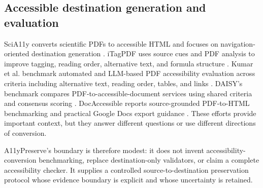 \subsection{Accessible destination generation and evaluation}
SciA11y converts scientific PDFs to accessible HTML and focuses on navigation-oriented destination generation \cite{wang2021scia11y}. iTagPDF uses source cues and PDF analysis to improve tagging, reading order, alternative text, and formula structure \cite{mowar2026}. Kumar et al. benchmark automated and LLM-based PDF accessibility evaluation across criteria including alternative text, reading order, tables, and links \cite{kumar2025}. DAISY's benchmark compares PDF-to-accessible-document services using shared criteria and consensus scoring \cite{daisy2026}. DocAccessible reports source-grounded PDF-to-HTML benchmarking and practical Google Docs export guidance \cite{docaccessible2026,docaccessible-google}. These efforts provide important context, but they answer different questions or use different directions of conversion.

A11yPreserve's boundary is therefore modest: it does not invent accessibility-conversion benchmarking, replace destination-only validators, or claim a complete accessibility checker. It supplies a controlled source-to-destination preservation protocol whose evidence boundary is explicit and whose uncertainty is retained.
